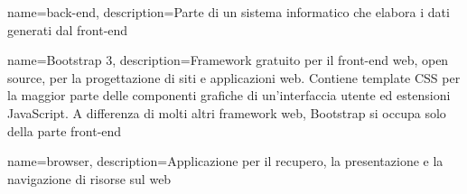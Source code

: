 \hypertarget{B}{}

{
	name=back-end,
	description={Parte di un sistema informatico che elabora i dati generati dal front-end}
}

{
	name=Bootstrap 3,
	description={Framework gratuito per il front-end web, open source, per la progettazione di siti e applicazioni web. Contiene template CSS per la maggior parte delle componenti grafiche di un'interfaccia utente ed estensioni JavaScript. A differenza di molti altri framework web, Bootstrap si occupa solo della parte front-end}
}

{
	name=browser,
	description={Applicazione per il recupero, la presentazione e la navigazione di risorse sul web}
}